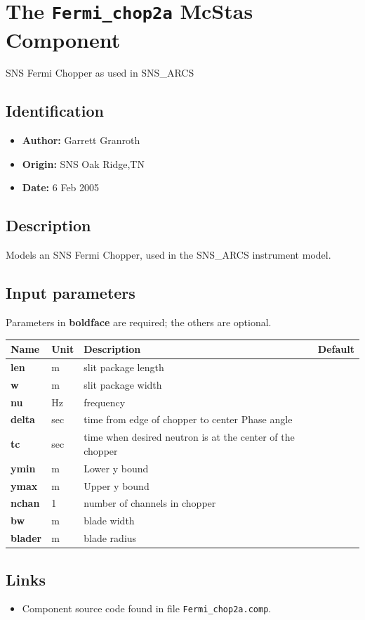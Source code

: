 \section{The \texttt{Fermi\_chop2a} McStas Component}
SNS Fermi Chopper as used in SNS\_ARCS

\subsection*{Identification}
\begin{itemize}
  \item \textbf{Author:} Garrett Granroth
  \item \textbf{Origin:} SNS Oak Ridge,TN
  \item \textbf{Date:} 6 Feb 2005
\end{itemize}

\subsection*{Description}
Models an SNS Fermi Chopper, used in the SNS\_ARCS instrument model.

\subsection*{Input parameters}
Parameters in \textbf{boldface} are required; the others are optional.

\begin{longtable}{p{}p{}p{}p{}}
\toprule
\textbf{Name} & \textbf{Unit} & \textbf{Description} & \textbf{Default} \\
\midrule
\endhead
\textbf{len} & m & slit package length &  \\
\textbf{w} & m & slit package width &  \\
\textbf{nu} & Hz & frequency &  \\
\textbf{delta} & sec & time from edge of chopper to center Phase angle &  \\
\textbf{tc} & sec & time when desired neutron is at the center of the chopper &  \\
\textbf{ymin} & m & Lower y bound &  \\
\textbf{ymax} & m & Upper y bound &  \\
\textbf{nchan} & 1 & number of channels in chopper &  \\
\textbf{bw} & m & blade width &  \\
\textbf{blader} & m & blade radius &  \\
\bottomrule
\end{longtable}

\subsection*{Links}
\begin{itemize}
  \item Component source code found in file \texttt{Fermi\_chop2a.comp}.
\end{itemize}
